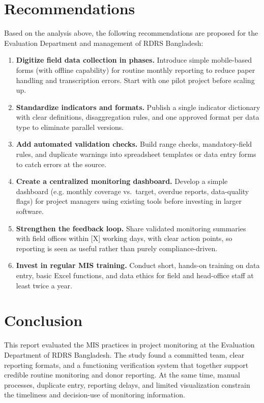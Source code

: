 \documentclass[12pt,a4paper]{report}
\begin{document}
\chapter{Recommendations}
Based on the analysis above, the following recommendations are proposed
for the Evaluation Department and management of RDRS Bangladesh:

\begin{enumerate}
    \item \textbf{Digitize field data collection in phases.} Introduce
        simple mobile-based forms (with offline capability) for routine
        monthly reporting to reduce paper handling and transcription
        errors. Start with one pilot project before scaling up.
    \item \textbf{Standardize indicators and formats.} Publish a single
        indicator dictionary with clear definitions, disaggregation
        rules, and one approved format per data type to eliminate
        parallel versions.
    \item \textbf{Add automated validation checks.} Build range checks,
        mandatory-field rules, and duplicate warnings into spreadsheet
        templates or data entry forms to catch errors at the source.
    \item \textbf{Create a centralized monitoring dashboard.} Develop a
        simple dashboard (e.g. monthly coverage vs.\ target, overdue
        reports, data-quality flags) for project managers using existing
        tools before investing in larger software.
    \item \textbf{Strengthen the feedback loop.} Share validated
        monitoring summaries with field offices within [X] working days,
        with clear action points, so reporting is seen as useful rather
        than purely compliance-driven.
    \item \textbf{Invest in regular MIS training.} Conduct short,
        hands-on training on data entry, basic Excel functions, and data
        ethics for field and head-office staff at least twice a year.
\end{enumerate}

\chapter{Conclusion}
This report evaluated the MIS practices in project monitoring at the
Evaluation Department of RDRS Bangladesh. The study found a committed
team, clear reporting formats, and a functioning verification system
that together support credible routine monitoring and donor reporting.
At the same time, manual processes, duplicate entry, reporting delays,
and limited visualization constrain the timeliness and decision-use of
monitoring information.
\end{document}
